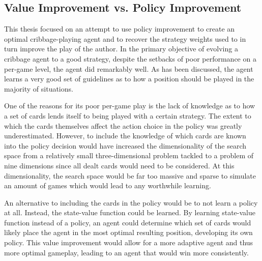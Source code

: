 

\subsection{Value Improvement vs. Policy Improvement}
\label{sec:disc-value}

This thesis focused on an attempt to use policy improvement to create an optimal
cribbage-playing agent and to recover the strategy weights used to in turn
improve the play of the author.
%
In the primary objective of evolving a cribbage agent to a good strategy,
despite the setbacks of poor performance on a per-game level,
the agent did remarkably well.
%
As has been discussed,
the agent learns a very good set of guidelines as to how a position should
be played in the majority of situations.

One of the reasons for its poor per-game play
is the lack of knowledge as to how a set of cards lends itself to being played
with a certain strategy.
%
The extent to which the cards themselves affect the action choice in the policy
was greatly underestimated.
%
However, %
to include the knowledge of which cards are known into the policy decision
would have increased the dimensionality of the search space from a relatively
small three-dimensional problem tackled to a problem of nine dimensions since
all dealt cards would need to be considered.
%
At this dimensionality,
the search space would be far too massive and sparse to simulate an amount of
games which would lead to any worthwhile learning.

An alternative to including the cards in the policy would be to not learn a
policy at all.
%
Instead,
the state-value function could be learned.
%
By learning state-value function instead of a policy,
an agent could determine which set of cards would likely place the agent in the
most optimal resulting position,
developing its own policy.
%
This value improvement would allow for a more adaptive agent and thus more
optimal gameplay,
leading to an agent that would win more consistently.

%
